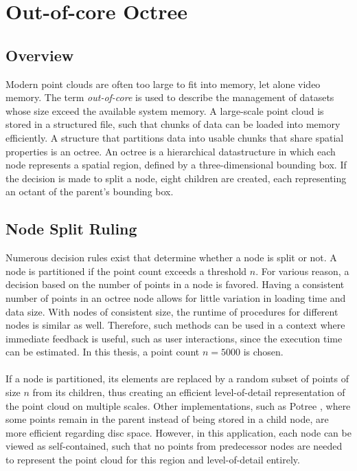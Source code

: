 \chapter{Out-of-core Octree}
\label{chap:octree}


\section{Overview}

Modern point clouds are often too large to fit into memory, let alone video memory. The term \textit{out-of-core} is used to describe the management of datasets whose size exceed the available system memory. 
A large-scale point cloud is stored in a structured file, such that chunks of data can be loaded into memory efficiently. A structure that partitions data into usable chunks that share spatial properties is an octree. 
An octree is a hierarchical datastructure in which each node represents a spatial region, defined by a three-dimensional bounding box. If the decision is made to split a node, eight children are created, each representing an octant of the parent's bounding box.


\section{Node Split Ruling}

Numerous decision rules exist that determine whether a node is split or not. A node is partitioned if the point count exceeds a threshold $n$.  For various reason, a decision based on the number of points in a node is favored. 
Having a consistent number of points in an octree node allows for little variation in loading time and data size. With nodes of consistent size, the runtime of procedures for different nodes is similar as well. Therefore, such methods can be used in a context where immediate feedback is useful, such as user interactions, since the execution time can be estimated. In this thesis, a point count $n = 5000$ is chosen. 
\\
\\
If a node is partitioned, its elements are replaced by a random subset of points of size $n$ from its children, thus creating an efficient level-of-detail representation of the point cloud on multiple scales. 
Other implementations, such as Potree \cite{SCHUETZ-2016-POT}, where some points remain in the parent instead of being stored in a child node, are more efficient regarding disc space. However, in this application, each node can be viewed as self-contained, such that no points from predecessor nodes are needed to represent the point cloud for this region and level-of-detail entirely. 


